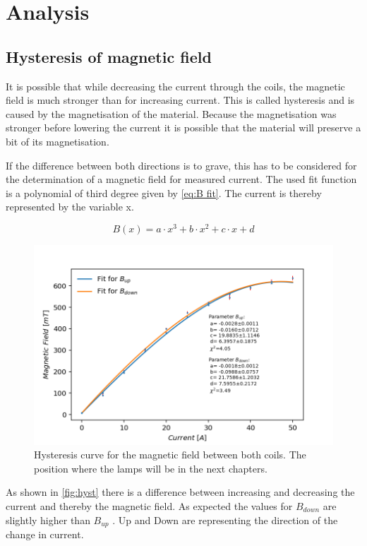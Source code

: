 \documentclass[]{article}
\begin{document}
\newpage
\section{Analysis}
\subsection{Hysteresis of magnetic field}
It is possible that while decreasing the current through the coils, the magnetic field is much stronger than for increasing current. This is called hysteresis and is caused by the magnetisation of the material. Because the magnetisation was stronger before lowering the current it is possible that the material will preserve a bit of its magnetisation.

If the difference between both directions is to grave, this has to be considered for the determination of a magnetic field for measured current. The used fit function is a polynomial of third degree given by \autoref{eq:B fit}. The current is thereby represented by the variable x.

\begin{equation}
B(x) = a\cdot x^3 + b\cdot x^2 + c\cdot x + d
\label{eq:B fit}
\end{equation}

\begin{figure}[H]
\centering
\includegraphics[width=.8\textwidth]{Plots/hysteresis.png}
\caption{Hysteresis curve for the magnetic field between both coils. The position where the lamps will be in the next chapters.}
\label{fig:hyst}
\end{figure}

As shown in \autoref{fig:hyst} there is a difference between increasing and decreasing the current and thereby the magnetic field. As expected the values for $B_{down}$ are slightly higher than $B_{up}$ . Up and Down are representing the direction of the change in current.
\end{document}
